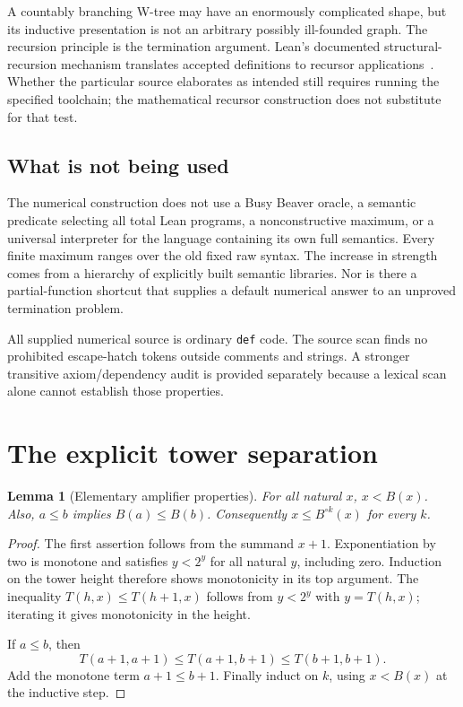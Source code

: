 \documentclass[11pt,letterpaper]{article}
\newtheorem{lemma}[theorem]{Lemma}
\theoremstyle{definition}
\newcommand{\code}[1]{\nolinkurl{#1}}
\begin{document}
A countably branching W-tree may have an enormously complicated shape, but
its inductive presentation is not an arbitrary possibly ill-founded graph.
The recursion principle is the termination argument. Lean's documented
structural-recursion mechanism translates accepted definitions to recursor
applications~\cite{leanrec}. Whether the particular source elaborates as
intended still requires running the specified toolchain; the mathematical
recursor construction does not substitute for that test.

\subsection{What is not being used}

The numerical construction does not use a Busy Beaver oracle, a semantic
predicate selecting all total Lean programs, a nonconstructive maximum, or a
universal interpreter for the language containing its own full semantics.
Every finite maximum ranges over the old fixed raw syntax. The increase in
strength comes from a hierarchy of explicitly built semantic libraries.
Nor is there a partial-function shortcut that supplies a default numerical
answer to an unproved termination problem.

All supplied numerical source is ordinary \code{def} code. The source scan
finds no prohibited escape-hatch tokens outside comments and strings. A
stronger transitive axiom/dependency audit is provided separately because a
lexical scan alone cannot establish those properties.

\section{The explicit tower separation}
\label{sec:margin}

\begin{lemma}[Elementary amplifier properties]
\label{lem:boost}
For all natural $x$, $x<B(x)$. Also, $a\le b$ implies $B(a)\le B(b)$.
Consequently $x\le B^{\circ k}(x)$ for every $k$.
\end{lemma}
\begin{proof}
The first assertion follows from the summand $x+1$. Exponentiation by two is
monotone and satisfies $y<2^y$ for all natural $y$, including zero. Induction
on the tower height therefore shows monotonicity in its top argument. The
inequality $T(h,x)\le T(h+1,x)$ follows from $y<2^y$ with $y=T(h,x)$; iterating
it gives monotonicity in the height.

If $a\le b$, then
\[
 T(a+1,a+1)\le T(a+1,b+1)\le T(b+1,b+1).
\]
Add the monotone term $a+1\le b+1$. Finally induct on $k$, using
$x<B(x)$ at the inductive step.
\end{proof}
\end{document}
